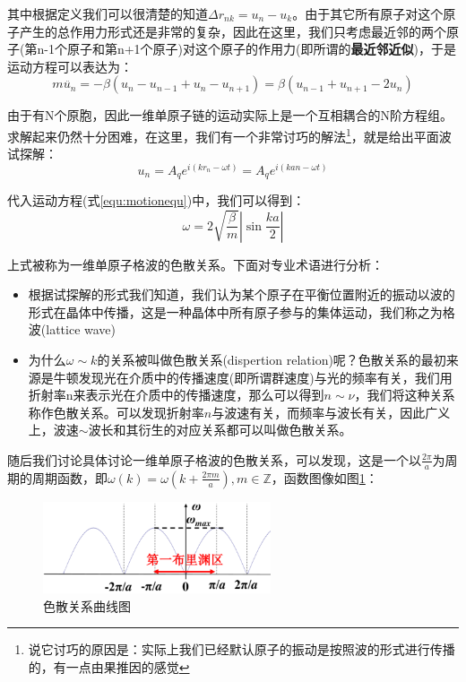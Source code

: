 \documentclass{ctexart}
\begin{document}
            其中根据定义我们可以很清楚的知道$\Delta r_{nk}=u_n-u_k$。由于其它所有原子对这个原子产生的总作用力形式还是非常的复杂，因此在这里，我们只考虑最近邻的两个原子(第n-1个原子和第n+1个原子)对这个原子的作用力(即所谓的\textbf{最近邻近似})，于是运动方程可以表达为：
            \begin{equation}\label{equ:motionequ}
                m\ddot{u_n}=-\beta(u_n-u_{n-1}+u_n-u_{n+1})=\beta(u_{n-1}+u_{n+1}-2u_n)
            \end{equation}
            
            由于有N个原胞，因此一维单原子链的运动实际上是一个互相耦合的N阶方程组。求解起来仍然十分困难，在这里，我们有一个非常讨巧的解法\footnote{说它讨巧的原因是：实际上我们已经默认原子的振动是按照波的形式进行传播的，有一点由果推因的感觉}，就是给出平面波试探解：
            \begin{equation}
                u_n=A_q e^{i(kr_n-\omega t)}=A_q e^{i(k a n-\omega t)}
            \end{equation}
            
            代入运动方程(式\eqref{equ:motionequ})中，我们可以得到：
            \begin{equation}
                \omega=2\sqrt{\frac{\beta}{m}}|\sin{\frac{ka}{2}}|
            \end{equation}
            
            上式被称为一维单原子格波的色散关系。下面对专业术语进行分析：
            
            \begin{itemize}
                \item 根据试探解的形式我们知道，我们认为某个原子在平衡位置附近的振动以波的形式在晶体中传播，这是一种晶体中所有原子参与的集体运动，我们称之为格波(lattice wave)
                \item 为什么$\omega\sim k$的关系被叫做色散关系(dispertion relation)呢？色散关系的最初来源是牛顿发现光在介质中的传播速度(即所谓群速度)与光的频率有关，我们用折射率n来表示光在介质中的传播速度，那么可以得到$n\sim \nu$，我们将这种关系称作色散关系。可以发现折射率$n$与波速有关，而频率与波长有关，因此广义上，波速$\sim$波长和其衍生的对应关系都可以叫做色散关系。
            \end{itemize}
            
            随后我们讨论具体讨论一维单原子格波的色散关系，可以发现，这是一个以$\frac{2\pi}{a}$为周期的周期函数，即$\omega(k)=\omega(k+\frac{2\pi m}{a}),m\in \mathbb{Z}$，函数图像如图\ref{fig:dispersionrelation}：
            \begin{figure}[H]
                \centering
                \includegraphics[width=0.6\textwidth]{figure/色散关系.png}
                \caption{色散关系曲线图}
                \label{fig:dispersionrelation}
            \end{figure}
            
\end{document}
